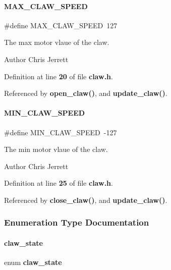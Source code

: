 \paragraph{M\+A\+X\+\_\+\+C\+L\+A\+W\+\_\+\+S\+P\+E\+ED}
{\footnotesize\ttfamily \#define M\+A\+X\+\_\+\+C\+L\+A\+W\+\_\+\+S\+P\+E\+ED~127}



The max motor vlaue of the claw. 

\begin{DoxyAuthor}{Author}
Chris Jerrett 
\end{DoxyAuthor}


Definition at line \textbf{ 20} of file \textbf{ claw.\+h}.



Referenced by \textbf{ open\+\_\+claw()}, and \textbf{ update\+\_\+claw()}.

\mbox{\label{claw_8h_a7306e61a4209c74862aa81d7b3de74e5}} 
\paragraph{M\+I\+N\+\_\+\+C\+L\+A\+W\+\_\+\+S\+P\+E\+ED}
{\footnotesize\ttfamily \#define M\+I\+N\+\_\+\+C\+L\+A\+W\+\_\+\+S\+P\+E\+ED~-\/127}



The min motor vlaue of the claw. 

\begin{DoxyAuthor}{Author}
Chris Jerrett 
\end{DoxyAuthor}


Definition at line \textbf{ 25} of file \textbf{ claw.\+h}.



Referenced by \textbf{ close\+\_\+claw()}, and \textbf{ update\+\_\+claw()}.



\subsubsection{Enumeration Type Documentation}
\mbox{\label{claw_8h_a600668fd307d596c3812126657335324}} 
\paragraph{claw\+\_\+state}
{\footnotesize\ttfamily enum \textbf{ claw\+\_\+state}}



